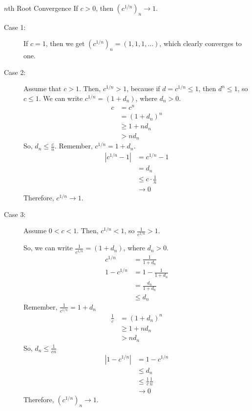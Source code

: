 \documentclass[10pt]{extarticle}
\begin{document}
  \begin{problem}{$n$th Root Convergence}
    If $c > 0$, then $\left(c^{1/n}\right)_n \rightarrow 1$.
    \tcblower
    \begin{description}
      \item[Case 1:] If $c = 1$, then we get $\left(c^{1/n}\right)_n = (1,1,1,\dots)$, which clearly converges to one.
      \item[Case 2:] Assume that $c > 1$. Then, $c^{1/n} > 1$, because if $d = c^{1/n} \leq 1$, then $d^n \leq 1$, so $c \leq 1$. We can write $c^{1/n} = (1 + d_n)$, where $d_n > 0$.
        \begin{align*}
          c &= c^n\\
            &= (1+d_n)^n\\
            &\geq 1 + nd_n \tag*{Bernoulli's Inequality}\\
            &> nd_n
        \end{align*}
        So, $d_n \leq \frac{c}{n}$. Remember, $c^{1/n} = 1 + d_n$.
        \begin{align*}
          |c^{1/n} - 1| &= c^{1/n} - 1\\
                        &= d_n\\
                        &\leq c \cdot \frac{1}{n}\\
                        &\rightarrow 0
        \end{align*}
        Therefore, $c^{1/n} \rightarrow 1$.\newline
      \item[Case 3:] Assume $0 < c < 1$. Then, $c^{1/n} <1$, so $\frac{1}{c^{1/n}} > 1$.\newline

        So, we can write $\frac{1}{c^{1/n}} = (1 + d_n)$, where $d_n > 0$.
        \begin{align*}
          c^{1/n}&=\frac{1}{1 + d_n}\\
          1-c^{1/n} &= 1-\frac{1}{1+d_n}\\
                    &= \frac{d_n}{1+d_n}\\
                    &\leq d_n
        \end{align*}
        Remember, $\frac{1}{c^{1/n}} = 1 + d_n$
        \begin{align*}
          \frac{1}{c} &= (1+d_n)^n\\
                      &\geq 1 + nd_n\\
                      &> nd_n
        \end{align*}
        So, $d_n \leq \frac{1}{cn}$
        \begin{align*}
          |1-c^{1/n}| &= 1-c^{1/n}\\
                      &\leq d_n\\
                      &\leq \frac{1}{c}\frac{1}{n}\\
                      &\rightarrow 0
        \end{align*}
        Therefore, $\left(c^{1/n}\right)_n \rightarrow 1$.
    \end{description}
  \end{problem}
\end{document}
